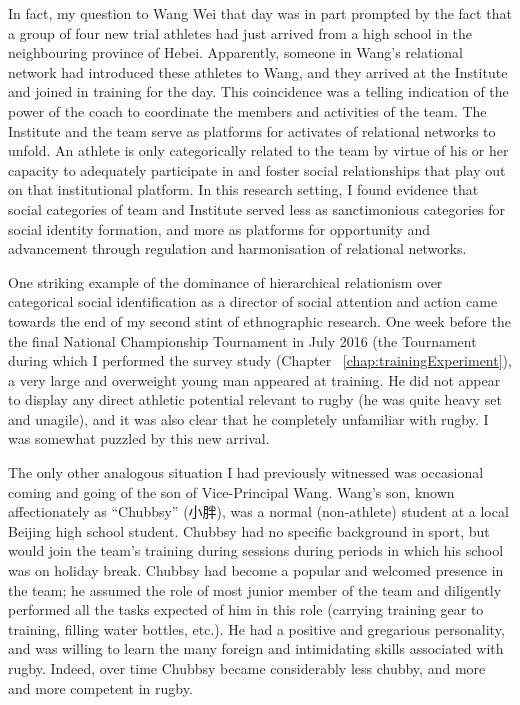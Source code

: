 \begin{CJK}{UTF8}{gbsn}
In fact, my question to Wang Wei that day was in part prompted by the fact that a group of four new trial athletes had just arrived from a high school in the neighbouring province of Hebei.  Apparently, someone in Wang's relational network had introduced these athletes to Wang, and they arrived at the Institute and joined in training for the day.  This coincidence was a telling indication of the power of the coach to coordinate the members and activities of the team.  The Institute and the team serve as platforms for activates of relational networks to unfold.  An athlete is only categorically related to the team by virtue of his or her capacity to adequately participate in and foster social relationships that play out on that institutional platform.  In this research setting, I found evidence that social categories of team and Institute served less as sanctimonious categories for social identity formation, and more as platforms for opportunity and advancement through regulation and harmonisation of relational networks.

One striking example of the dominance of hierarchical relationism over categorical social identification as a director of social attention and action came towards the end of my second stint of ethnographic research. One week before the the final National Championship Tournament in July 2016 (the Tournament during which I performed the survey study (Chapter ~\ref{chap:trainingExperiment}), a very large and overweight young man appeared at training.  He did not appear to display any direct athletic potential relevant to rugby (he was quite heavy set and unagile), and it was also clear that he completely unfamiliar with rugby.  I was somewhat puzzled by this new arrival.

The only other analogous situation I had previously witnessed was occasional coming and going of the son of Vice-Principal Wang. Wang's son, known affectionately as ``Chubbsy'' (小胖), was a normal (non-athlete) student at a local Beijing high school student.  Chubbsy had no specific background in sport, but would join the team's training during sessions during periods in which his school was on holiday break.  Chubbsy had become a popular and welcomed presence in the team; he assumed the role of most junior member of the team and diligently performed all the tasks expected of him in this role (carrying training gear to training, filling water bottles, etc.). He had a positive and gregarious personality, and was willing to learn the many foreign and intimidating skills associated with rugby.
Indeed, over time Chubbsy became considerably less chubby, and more and more competent in rugby.


\end{CJK}
